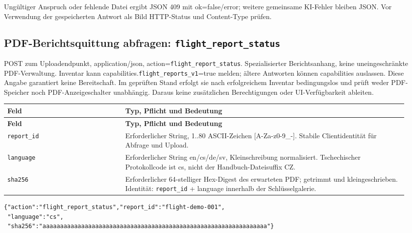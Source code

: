 \documentclass[11pt,a4paper]{article}
\newcommand{\codeword}[1]{\nolinkurl{#1}}
\begin{document}
Ungültiger Anspruch oder fehlende Datei ergibt JSON 409 mit ok=false/error; weitere
gemeinsame KI-Fehler bleiben JSON. Vor Verwendung der gespeicherten Antwort als Bild
HTTP-Status und Content-Type prüfen.

\subsection{\texorpdfstring{PDF-Berichtsquittung abfragen: \codeword{flight_report_status}}{PDF-Berichtsquittung abfragen: flight\_report\_status}}

\label{api352:flight-report-status}

POST zum Uploadendpunkt, application/json, action=\codeword{flight_report_status}.
Spezialisierter Berichtsanhang, keine uneingeschränkte PDF-Verwaltung. Inventar kann
capabilities.\codeword{flight_reports_v1}=true melden; ältere Antworten können capabilities
auslassen. Diese Angabe garantiert keine Bereitschaft. Im geprüften Stand erfolgt sie nach
erfolgreichem Inventar bedingungslos und prüft weder PDF-Speicher noch PDF-Anzeigeschalter
unabhängig. Daraus keine zusätzlichen Berechtigungen oder UI-Verfügbarkeit ableiten.

\begin{longtable}{@{}>{\RaggedRight\arraybackslash}p{0.28\linewidth}>{\RaggedRight\arraybackslash}p{0.67\linewidth}@{}}
\toprule
\textbf{Feld} & \textbf{Typ, Pflicht und Bedeutung} \\
\midrule
\endfirsthead
\toprule
\textbf{Feld} & \textbf{Typ, Pflicht und Bedeutung} \\
\midrule
\endhead
\bottomrule
\endfoot
\codeword{report_id} & Erforderlicher String, 1..80 ASCII-Zeichen [A-Za-z0-9\_-]. Stabile
Clientidentität für Abfrage und Upload. \\
\codeword{language} & Erforderlicher String en/cs/de/sv, Kleinschreibung normalisiert.
Tschechischer Protokollcode ist cs, nicht der Handbuch-Dateisuffix CZ. \\
\codeword{sha256} & Erforderlicher 64-stelliger Hex-Digest des erwarteten PDF; getrimmt und
kleingeschrieben. Identität: \codeword{report_id} + language innerhalb der Schlüsselgalerie.
\\
\end{longtable}

\begin{lstlisting}[language={}]
{"action":"flight_report_status","report_id":"flight-demo-001",
 "language":"cs",
 "sha256":"aaaaaaaaaaaaaaaaaaaaaaaaaaaaaaaaaaaaaaaaaaaaaaaaaaaaaaaaaaaaaaaa"}
\end{lstlisting}
\end{document}
